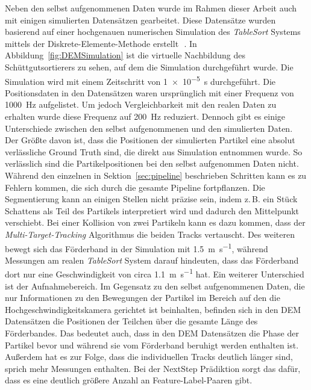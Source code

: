 
Neben den selbst aufgenommenen Daten wurde im Rahmen dieser Arbeit auch mit einigen simulierten Datensätzen gearbeitet.
Diese Datensätze wurden basierend auf einer hochgenauen numerischen Simulation des \textit{TableSort} Systems mittels der Diskrete-Elemente-Methode erstellt~\cite{pieper2016numerical}\,\cite{pieper2017numerical}.
In Abbildung~\ref{fig:DEMSimulation} ist die virtuelle Nachbildung des Schüttgutsortierers zu sehen, auf dem die Simulation durchgeführt wurde.
Die Simulation wird mit einem Zeitschritt von \SI{1e-5}{\second} durchgeführt.
Die Positionsdaten in den Datensätzen waren ursprünglich mit einer Frequenz von \SI{1000}{\hertz} aufgelistet.
Um jedoch Vergleichbarkeit mit den realen Daten zu erhalten wurde diese Frequenz auf \SI{200}{\hertz} reduziert.
Dennoch gibt es einige Unterschiede zwischen den selbst aufgenommenen und den simulierten Daten.
Der Größte davon ist, dass die Positionen der simulierten Partikel eine absolut verlässliche Ground Truth sind, 
die direkt aus Simulation entnommen wurde.
So verlässlich sind die Partikelpositionen bei den selbst aufgenommen Daten nicht.
Während den einzelnen in Sektion~\ref{sec:pipeline} beschrieben Schritten kann es zu Fehlern kommen, die sich durch die gesamte Pipeline fortpflanzen.
Die Segmentierung kann an einigen Stellen nicht präzise sein, indem z.\,B. ein Stück Schattens als Teil des Partikels interpretiert wird und dadurch den Mittelpunkt verschiebt. 
Bei einer Kollision von zwei Partikeln kann es dazu kommen, dass der \textit{Multi-Target-Tracking} Algorithmus die beiden Tracks vertauscht.  
Des weiteren bewegt sich das Förderband in der Simulation mit \SI{1.5}{\meter\per\second}, 
während Messungen am realen \textit{TableSort} System darauf hindeuten, dass das Förderband dort nur eine Geschwindigkeit von 
circa \SI{1.1}{\meter\per\second} hat.
Ein weiterer Unterschied ist der Aufnahmebereich.
Im Gegensatz zu den selbst aufgenommenen Daten, die nur Informationen 
zu den Bewegungen der Partikel im Bereich auf den die Hochgeschwindigkeitskamera gerichtet ist beinhalten, 
befinden sich in den DEM Datensätzen die Positionen der Teilchen über die gesamte Länge des Förderbandes.
Das bedeutet auch, dass in den DEM Datensätzen die Phase der Partikel bevor und während sie vom Förderband beruhigt werden enthalten ist.
Außerdem hat es zur Folge, dass die individuellen Tracks deutlich länger sind, sprich mehr Messungen enthalten.
Bei der NextStep Prädiktion sorgt das dafür, dass es eine deutlich größere Anzahl an Feature-Label-Paaren gibt.


